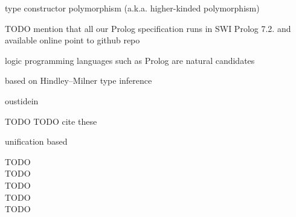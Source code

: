 type constructor polymorphism (a.k.a. higher-kinded polymorphism)

TODO mention that all our Prolog specification runs in SWI Prolog 7.2.
and available online point to github repo


logic programming languages such as Prolog are natural candidates

based on Hindley--Milner type inference


oustidein \cite{OutsideInICFP09}


TODO TODO cite these

unification based

TODO\\
TODO\\
TODO\\
TODO\\
TODO\\


